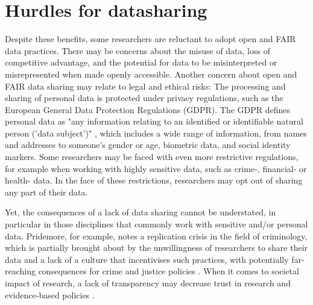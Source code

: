 
\section{Hurdles for datasharing}

Despite these benefits, some researchers are reluctant to adopt open and FAIR data practices. There may be concerns about the misuse of data, loss of competitive advantage, and the potential for data to be misinterpreted or misrepresented when made openly accessible. Another concern about open and FAIR data sharing may relate to legal and ethical risks: The processing and sharing of personal data is protected under privacy regulations, such as the European General Data Protection Regulations (GDPR). The GDPR defines personal data as "any information relating to an identified or identifiable natural person ('data subject')" \cite{gdpr2016general}, which includes a wide range of information, from names and addresses to someone's gender or age, biometric data, and social identity markers. Some researchers may be faced with even more restrictive regulations, for example when working with highly sensitive data, such as crime-, financial- or health- data. In the face of these restrictions, researchers may opt out of sharing any part of their data.  

Yet, the consequences of a lack of data sharing cannot be understated, in particular in those disciplines that commonly work with sensitive and/or personal data. Pridemore, for example, notes a replication crisis in the field of criminology, which is partially brought about by the unwillingness of researchers to share their data and a lack of a culture that incentivises such practices, with potentially far-reaching consequences for crime and justice policies \cite{pridemore2018replication}. When it comes to societal impact of research, a lack of transparency may decrease trust in research and evidence-based policies \cite{freese2022advances,powers2019open}. 

